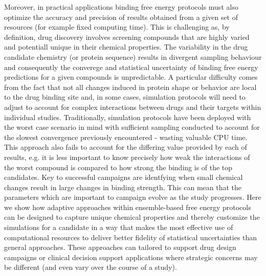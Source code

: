 Moreover, in practical applications binding free energy protocols must also 
optimize the accuracy and precision of results obtained from a given set of 
resources (for example fixed computing time). 
This is challenging as, by definition, drug discovery involves screening 
compounds that are highly varied and potentiall unique in their chemical 
properties. 
The variability in the drug candidate chemistry (or protein sequence) results 
in divergent sampling  behaviour and consequently the converege and statistical 
uncertainty of binding free energy predictions for a given compounds is 
unpredictable.
A particular difficulty comes from the fact that not all changes induced in 
protein shape or behavior are local to the drug binding site and, in 
some cases, simulation protocols will need to adjust to account for complex 
interactions between drugs and their targets within individual studies.
Traditionally, simulation protocols have been deployed with the worst case 
scenario in mind with sufficient sampling conducted to account for the 
slowest convergence previously encountered - wasting valuable CPU time.
This approach also fails to account for the differing value provided by
each  of results, e.g. it is less important to know precisely how weak 
the interactions of the worst compound is compared to how strong the binding 
is of the top candidates.
Key to successful campaigns are identfying when small chemical changes result in 
large changes in binding strength.
This can mean that the parameters which are important to campaign evolve as the
study progresses.
Here we show how adaptive approaches within ensemble-based free energy 
protocols can be designed to capture unique chemical properties and thereby 
customize the simulations for a candidate in a way that makes the most 
effective use of computational resources to deliver better fidelity of 
statistical uncertainties than general approaches. 
These approaches can tailored to support drug design campaigns or clinical 
decision support applications where strategic concerns may be different 
(and even vary over the course of a study).

